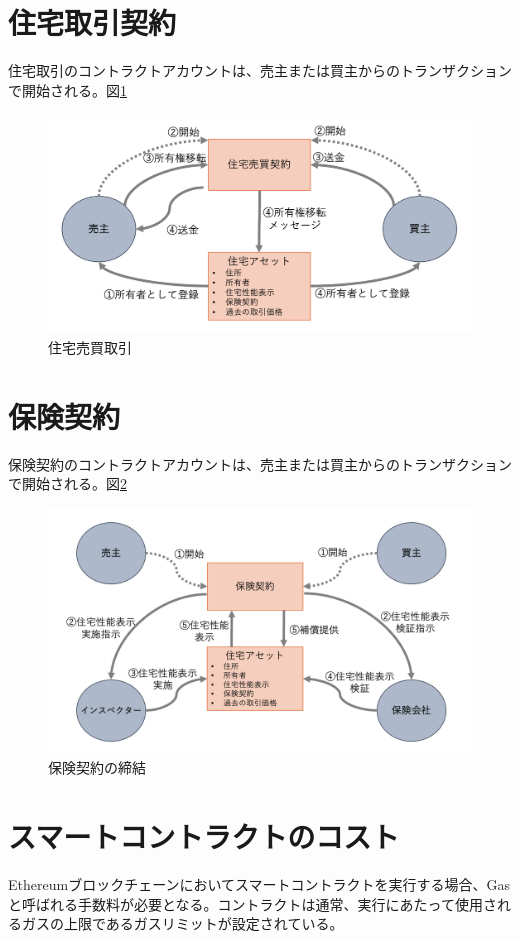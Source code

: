 \documentclass[a4paper,fontsize=11pt,report,notitlepage,line_length=38zw,number_of_lines=40,dvipdfmx]{jlreq}
\begin{document}
\section{住宅取引契約}
住宅取引のコントラクトアカウントは、売主または買主からのトランザクションで開始される。図\ref{spa}

\begin{figure}
 \centering
 \includegraphics[width=15cm]{spa.png}
 \caption{住宅売買取引}
 \label{spa}
\end{figure}


\section{保険契約}
保険契約のコントラクトアカウントは、売主または買主からのトランザクションで開始される。図\ref{insurance}

\begin{figure}
 \centering
 \includegraphics[width=15cm]{insurance.png}
 \caption{保険契約の締結}
 \label{insurance}
\end{figure}

\section{スマートコントラクトのコスト}
Ethereumブロックチェーンにおいてスマートコントラクトを実行する場合、Gasと呼ばれる手数料が必要となる。コントラクトは通常、実行にあたって使用されるガスの上限であるガスリミットが設定されている。
\end{document}
